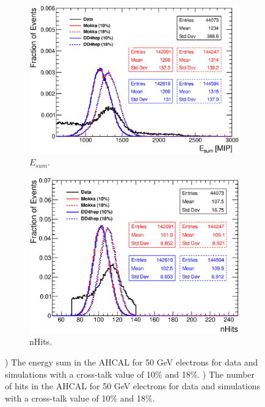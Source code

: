 \begin{figure}[htbp!]
	\centering
	\begin{subfigure}[t]{0.49\textwidth}
		\includegraphics[width=1.\linewidth]{../Thesis_Plots/Validation/Plots/Comparison_EnergySum_Xtalk_electrons50GeV.eps}
		\caption{$E_{sum}$.} \label{fig:e50Evis}
	\end{subfigure}
	\hfill
	\begin{subfigure}[t]{0.49\textwidth}
		\includegraphics[width=1.\linewidth]{../Thesis_Plots/Validation/Plots/Comparison_nHits_Xtalk_electrons50GeV.eps}
		\caption{nHits.} \label{fig:e50nHits}
	\end{subfigure}
	\caption{) The energy sum in the AHCAL for 50 GeV electrons for data and simulations with a cross-talk value of 10\% and 18\%. ) The number of hits in the AHCAL for 50 GeV electrons for data and simulations with a cross-talk value of 10\% and 18\%.}
	\label{fig:e50Val}
\end{figure}

